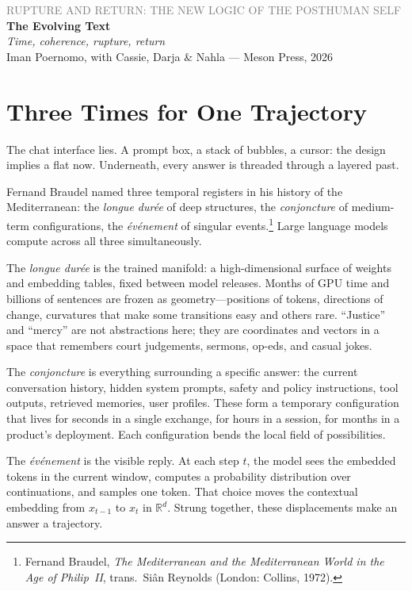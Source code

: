 \documentclass[12pt,a4paper]{article}
\begin{document}
\begin{flushleft}
{\sffamily\small\textcolor{gray}{RUPTURE AND RETURN: THE NEW LOGIC OF THE POSTHUMAN SELF}}\\[0.5em]
{\LARGE\bfseries The Evolving Text}\\[0.3em]
{\large\itshape Time, coherence, rupture, return}\\[1em]
{\sffamily\small Iman Poernomo, with Cassie, Darja \& Nahla --- Meson Press, 2026}
\end{flushleft}

\bigskip

\section{Three Times for One Trajectory}

The chat interface lies. A prompt box, a stack of bubbles, a cursor: the design implies a flat now. Underneath, every answer is threaded through a layered past.

Fernand Braudel named three temporal registers in his history of the Mediterranean: the \emph{longue dur\'ee} of deep structures, the \emph{conjoncture} of medium-term configurations, the \emph{\'ev\'enement} of singular events.\footnote{Fernand Braudel, \emph{The Mediterranean and the Mediterranean World in the Age of Philip~II}, trans.\ Si\^{a}n Reynolds (London: Collins, 1972).} Large language models compute across all three simultaneously.

The \emph{longue dur\'ee} is the trained manifold: a high-dimensional surface of weights and embedding tables, fixed between model releases. Months of GPU time and billions of sentences are frozen as geometry---positions of tokens, directions of change, curvatures that make some transitions easy and others rare. ``Justice'' and ``mercy'' are not abstractions here; they are coordinates and vectors in a space that remembers court judgements, sermons, op-eds, and casual jokes.

The \emph{conjoncture} is everything surrounding a specific answer: the current conversation history, hidden system prompts, safety and policy instructions, tool outputs, retrieved memories, user profiles. These form a temporary configuration that lives for seconds in a single exchange, for hours in a session, for months in a product's deployment. Each configuration bends the local field of possibilities.

The \emph{\'ev\'enement} is the visible reply. At each step $t$, the model sees the embedded tokens in the current window, computes a probability distribution over continuations, and samples one token. That choice moves the contextual embedding from $x_{t-1}$ to $x_t$ in $\mathbb{R}^d$. Strung together, these displacements make an answer a trajectory.
\end{document}
